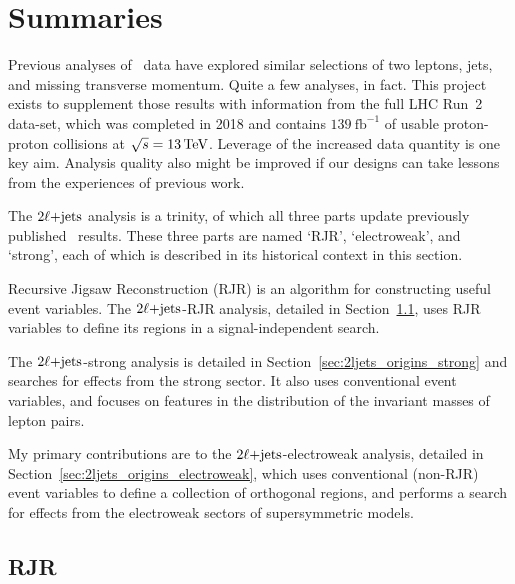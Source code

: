 \clearpage
\FloatBarrier
\section{Summaries}
\label{sec:2ljets_context}
Previous analyses of \atlas\ data have explored similar selections of
two leptons, jets, and missing transverse momentum.
Quite a few analyses, in fact.
This project exists to supplement those results with information from the full
LHC Run~2 data-set, which was completed in 2018 and contains
$139~\mathrm{fb}^{-1}$ of usable proton-proton collisions at
$\sqrt{s} = 13\,\eV[T]$.
Leverage of the increased data quantity is one key aim.
Analysis quality also might be improved if our designs can take lessons from
the experiences of previous work.


The $\twoljets$ analysis is a trinity,
of which all three parts update previously published \atlas\ results.
These three parts are named `RJR', `electroweak', and `strong', each of which
is described in its historical context in this section.

Recursive Jigsaw Reconstruction (RJR) is an algorithm for constructing useful
event variables.
The $\twoljets$-RJR analysis, detailed in Section~\ref{sec:2ljets_origins_rjr},
uses RJR variables to define its regions in a signal-independent search.

The $\twoljets$-strong analysis is
detailed in Section~\ref{sec:2ljets_origins_strong} and
searches for effects from the strong sector.
It also uses conventional event variables, and focuses on features in the
distribution of the invariant masses of lepton pairs.

My primary contributions are to the $\twoljets$-electroweak analysis,
detailed in Section~\ref{sec:2ljets_origins_electroweak},
which uses conventional (non-RJR) event variables to define a collection of
orthogonal regions, and performs a search for effects from the electroweak
sectors of supersymmetric models.


\subsection{RJR}
\label{sec:2ljets_origins_rjr}

